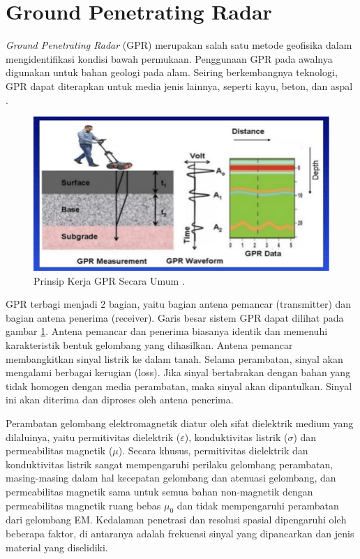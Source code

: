 \section{Ground Penetrating Radar}
\label{sec:groundPenetratingRadar}

\emph{Ground Penetrating Radar} (GPR) merupakan salah satu metode geofisika dalam mengidentifikasi kondisi bawah permukaan. 
Penggunaan GPR pada awalnya digunakan untuk bahan geologi pada alam. 
Seiring berkembangnya teknologi, GPR dapat diterapkan untuk media jenis lainnya, seperti kayu, beton, dan aspal \parencite{jol2008ground}.

\begin{figure}[ht]
  \centering
  \includegraphics[scale=0.35]{gambar/prinsipGPR.png}
  \caption{Prinsip Kerja GPR Secara Umum \parencite{gprPrinciple}.}
  \label{fig:prinsipGpr}
\end{figure}

GPR terbagi menjadi 2 bagian, yaitu bagian antena pemancar (transmitter) dan bagian antena penerima (receiver). 
Garis besar sistem GPR dapat dilihat pada gambar \ref{fig:prinsipGpr}. 
Antena pemancar dan penerima biasanya identik dan memenuhi karakteristik bentuk gelombang yang dihasilkan. 
Antena pemancar membangkitkan sinyal listrik ke dalam tanah. 
Selama perambatan, sinyal akan mengalami berbagai kerugian (loss). 
Jika sinyal bertabrakan dengan bahan yang tidak homogen dengan media perambatan, maka sinyal akan dipantulkan. 
Sinyal ini akan diterima dan diproses oleh antena penerima.

Perambatan gelombang elektromagnetik diatur oleh sifat dielektrik medium yang dilaluinya, yaitu permitivitas dielektrik ($\varepsilon$), konduktivitas listrik ($\sigma$) dan permeabilitas magnetik ($\mu$). 
Secara khusus, permitivitas dielektrik dan konduktivitas listrik sangat mempengaruhi perilaku gelombang perambatan, masing-masing dalam hal kecepatan gelombang dan atenuasi gelombang, dan permeabilitas magnetik sama untuk semua bahan non-magnetik dengan permeabilitas magnetik ruang bebas $\mu_{0}$ dan tidak mempengaruhi perambatan dari gelombang EM. 
Kedalaman penetrasi dan resolusi spasial dipengaruhi oleh beberapa faktor, di antaranya adalah frekuensi sinyal yang dipancarkan dan jenis material yang diselidiki. \parencite{gprIntroduction}

